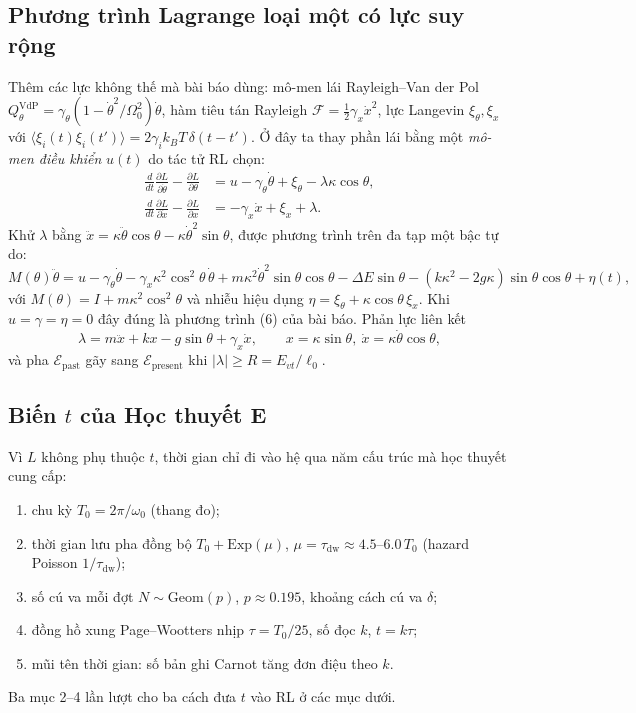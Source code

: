 \documentclass[11pt,a4paper]{article}
\newcommand{\Epast}{\mathcal{E}_{\text{past}}}
\newcommand{\Epres}{\mathcal{E}_{\text{present}}}
\theoremstyle{remark}
\begin{document}
\subsection{Phương trình Lagrange loại một có lực suy rộng}
Thêm các lực không thế mà bài báo dùng: mô-men lái Rayleigh--Van der Pol $Q_\theta^{\text{VdP}}=\gamma_\theta(1-\dot\theta^2/\Omega_0^2)\dot\theta$, hàm tiêu tán Rayleigh $\mathcal F=\tfrac12\gamma_x\dot x^2$, lực Langevin $\xi_\theta,\xi_x$ với $\langle\xi_i(t)\xi_i(t')\rangle=2\gamma_ik_BT\,\delta(t-t')$. Ở đây ta thay phần lái bằng một \emph{mô-men điều khiển} $u(t)$ do tác tử RL chọn:
\begin{align}
\frac{d}{dt}\frac{\partial L}{\partial\dot\theta}-\frac{\partial L}{\partial\theta}&=u-\gamma_\theta\dot\theta+\xi_\theta-\lambda\kappa\cos\theta, \label{eq:ELth}\\
\frac{d}{dt}\frac{\partial L}{\partial\dot x}-\frac{\partial L}{\partial x}&=-\gamma_x\dot x+\xi_x+\lambda. \label{eq:ELx}
\end{align}
Khử $\lambda$ bằng $\ddot x=\kappa\ddot\theta\cos\theta-\kappa\dot\theta^2\sin\theta$, được phương trình trên đa tạp một bậc tự do:
\begin{equation}
M(\theta)\ddot\theta=u-\gamma_\theta\dot\theta-\gamma_x\kappa^2\cos^2\theta\,\dot\theta+m\kappa^2\dot\theta^2\sin\theta\cos\theta-\Delta E\sin\theta-(k\kappa^2-2g\kappa)\sin\theta\cos\theta+\eta(t),
\label{eq:reduced}
\end{equation}
với $M(\theta)=I+m\kappa^2\cos^2\theta$ và nhiễu hiệu dụng $\eta=\xi_\theta+\kappa\cos\theta\,\xi_x$. Khi $u=\gamma=\eta=0$ đây đúng là phương trình (6) của bài báo. Phản lực liên kết
\begin{equation}
\lambda=m\ddot x+kx-g\sin\theta+\gamma_x\dot x,\qquad x=\kappa\sin\theta,\ \dot x=\kappa\dot\theta\cos\theta,
\label{eq:lambda}
\end{equation}
và pha $\Epast$ gãy sang $\Epres$ khi $|\lambda|\ge R=E_{vt}/\ell_0$.

\subsection{Biến $t$ của Học thuyết E}
Vì $L$ không phụ thuộc $t$, thời gian chỉ đi vào hệ qua năm cấu trúc mà học thuyết cung cấp:
\begin{enumerate}
\item chu kỳ $T_0=2\pi/\omega_0$ (thang đo);
\item thời gian lưu pha đồng bộ $T_0+\mathrm{Exp}(\mu)$, $\mu=\tau_{\text{dw}}\approx4.5$--$6.0\,T_0$ (hazard Poisson $1/\tau_{\text{dw}}$);
\item số cú va mỗi đợt $N\sim\mathrm{Geom}(p)$, $p\approx0.195$, khoảng cách cú va $\delta$;
\item đồng hồ xung Page--Wootters nhịp $\tau=T_0/25$, số đọc $k$, $t=k\tau$;
\item mũi tên thời gian: số bản ghi Carnot tăng đơn điệu theo $k$.
\end{enumerate}
Ba mục 2--4 lần lượt cho ba cách đưa $t$ vào RL ở các mục dưới.
\end{document}
